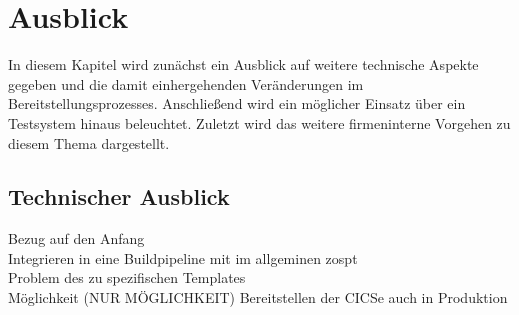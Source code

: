 \chapter{Ausblick}\label{ch:ausblick}
In diesem Kapitel wird zunächst ein Ausblick auf weitere technische Aspekte gegeben und die damit einhergehenden Veränderungen im Bereitstellungsprozesses.
Anschließend wird ein möglicher Einsatz über ein Testsystem hinaus beleuchtet.
Zuletzt wird das weitere firmeninterne Vorgehen zu diesem Thema dargestellt.

\section{Technischer Ausblick}\label{sec:techaus}


Bezug auf den Anfang\\
Integrieren in eine Buildpipeline mit im allgeminen zospt\\
Problem des zu spezifischen Templates\\
Möglichkeit (NUR MÖGLICHKEIT) Bereitstellen der CICSe auch in Produktion
